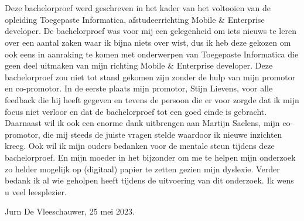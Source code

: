 
\chapter*{}%
\label{ch:voorwoord}

Deze bachelorproef werd geschreven in het kader van het voltooien van de opleiding Toegepaste Informatica, afstudeerrichting Mobile \& Enterprise developer.
De bachelorproef was voor mij een gelegenheid om iets nieuws te leren over een aantal zaken waar ik bijna niets over wist, dus ik heb deze gekozen om ook eens in aanraking te komen met onderwerpen van Toegepaste Informatica die geen deel uitmaken van mijn richting Mobile \& Enterprise developer.
Deze bachelorproef zou niet tot stand gekomen zijn zonder de hulp van mijn promotor en co-promotor.
In de eerste plaats mijn promotor, Stijn Lievens, voor alle feedback die hij heeft gegeven en tevens de persoon die er voor zorgde dat ik mijn focus niet verloor en dat de bachelorproef tot een goed einde is gebracht.
Daarnaast wil ik ook een enorme dank uitbrengen aan Martijn Saelens, mijn co-promotor, die mij steeds de juiste vragen stelde waardoor ik nieuwe inzichten kreeg.
Ook wil ik mijn ouders bedanken voor de mentale steun tijdens deze bachelorproef. En mijn moeder in het bijzonder om me te helpen mijn onderzoek zo helder mogelijk op (digitaal) papier te zetten gezien mijn dyslexie.
Verder bedank ik al wie geholpen heeft tijdens de uitvoering van dit onderzoek.
\newline
Ik wens u veel leesplezier.

Jurn De Vleeschauwer, 25 mei 2023.
